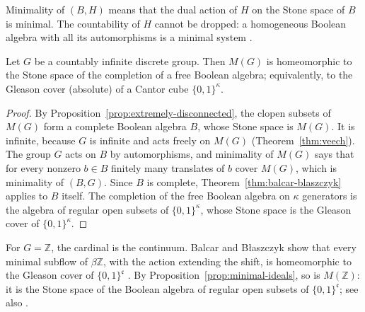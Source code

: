 \begin{remark}\label{rem:balcar-blaszczyk}
Minimality of $(B,H)$ means that the dual action of $H$ on the Stone space of
$B$ is minimal. The countability of $H$ cannot be dropped: a homogeneous
Boolean algebra with all its automorphisms is a minimal system
\cite{BalcarBlaszczyk1990}.
\end{remark}

\begin{corollary}\label{cor:discrete-cohen}
Let $G$ be a countably infinite discrete group. Then $M(G)$ is homeomorphic to
the Stone space of the completion of a free Boolean algebra; equivalently, to
the Gleason cover (absolute) of a Cantor cube $\{0,1\}^\kappa$.
\end{corollary}

\begin{proof}
By Proposition~\ref{prop:extremely-disconnected}, the clopen subsets of $M(G)$
form a complete Boolean algebra $B$, whose Stone space is $M(G)$. It is
infinite, because $G$ is infinite and acts freely on $M(G)$
(Theorem~\ref{thm:veech}). The group $G$ acts on $B$ by automorphisms, and
minimality of $M(G)$ says that for every nonzero $b\in B$ finitely many
translates of $b$ cover $M(G)$, which is minimality of $(B,G)$. Since $B$ is
complete, Theorem~\ref{thm:balcar-blaszczyk} applies to $B$ itself. The
completion of the free Boolean algebra on $\kappa$ generators is the algebra
of regular open subsets of $\{0,1\}^\kappa$, whose Stone space is the Gleason
cover of $\{0,1\}^\kappa$.
\end{proof}

\begin{example}\label{ex:umf-integers}
For $G=\mathbb{Z}$, the cardinal is the continuum. Balcar and Błaszczyk show
that every minimal subflow of $\beta\mathbb{Z}$, with the action extending
the shift, is homeomorphic to the Gleason cover of $\{0,1\}^{\mathfrak{c}}$
\cite{BalcarBlaszczyk1990}. By Proposition~\ref{prop:minimal-ideals}, so is
$M(\mathbb{Z})$: it is the Stone space of the Boolean algebra of regular open
subsets of $\{0,1\}^{\mathfrak{c}}$; see also \cite{BartosovaKwiatkowska2019}.
\end{example}
